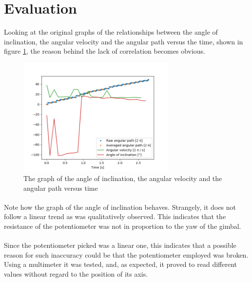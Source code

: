 \documentclass[a4paper]{article}
\begin{document}
\section{Evaluation}

\paragraph*{}
Looking at the original graphs of the relationships between the angle of
inclination, the angular velocity and the angular path versus the time, shown
in figure \ref{fig:all-vs-time-5}, the reason behind the lack of correlation
becomes obvious.

\begin{figure}[ht]
  \centering
  \includegraphics[width=0.7\textwidth]{img/all-vs-time-5}
  \caption{The graph of the angle of inclination, the angular velocity and the
  angular path versus time}
  \label{fig:all-vs-time-5}
\end{figure}

\paragraph*{}
Note how the graph of the angle of inclination behaves. Strangely, it does not
follow a linear trend as was qualitatively observed. This indicates that the
resistance of the potentiometer was not in proportion to the yaw of the gimbal.

\paragraph*{}
Since the potentiometer picked was a linear one, this indicates that a possible
reason for such inaccuracy could be that the potentiometer employed was broken.
Using a multimeter it was tested, and, as expected, it proved to read different
values without regard to the position of its axis.
\end{document}
